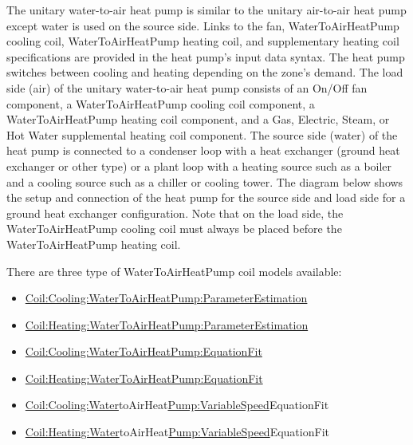 The unitary water-to-air heat pump is similar to the unitary air-to-air heat pump except water is used on the source side. Links to the fan, WaterToAirHeatPump cooling coil, WaterToAirHeatPump heating coil, and supplementary heating coil specifications are provided in the heat pump's input data syntax. The heat pump switches between cooling and heating depending on the zone's demand. The load side (air) of the unitary water-to-air heat pump consists of an On/Off fan component, a WaterToAirHeatPump cooling coil component, a WaterToAirHeatPump heating coil component, and a Gas, Electric, Steam, or Hot Water supplemental heating coil component. The source side (water) of the heat pump is connected to a condenser loop with a heat exchanger (ground heat exchanger or other type) or a plant loop with a heating source such as a boiler and a cooling source such as a chiller or cooling tower. The diagram below shows the setup and connection of the heat pump for the source side and load side for a ground heat exchanger configuration. Note that on the load side, the WaterToAirHeatPump cooling coil must always be placed before the WaterToAirHeatPump heating coil.

There are three type of WaterToAirHeatPump coil models available:

\begin{itemize}
\item
  \hyperref[coilcoolingwatertoairheatpumpparameterestimation]{Coil:Cooling:WaterToAirHeatPump:ParameterEstimation}
\item
  \hyperref[coilheatingwatertoairheatpumpparameterestimation]{Coil:Heating:WaterToAirHeatPump:ParameterEstimation}
\item
  \hyperref[coilcoolingwatertoairheatpumpequationfit]{Coil:Cooling:WaterToAirHeatPump:EquationFit}
\item
  \hyperref[coilheatingwatertoairheatpumpequationfit]{Coil:Heating:WaterToAirHeatPump:EquationFit}
\item
  \hyperref[coilcoolingwater]{Coil:Cooling:Water}toAirHeat\hyperref[pumpvariablespeed]{Pump:VariableSpeed}EquationFit
\item
  \hyperref[coilheatingwater]{Coil:Heating:Water}toAirHeat\hyperref[pumpvariablespeed]{Pump:VariableSpeed}EquationFit
\end{itemize}

